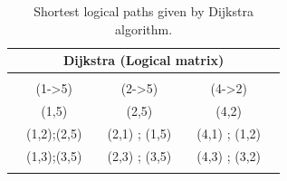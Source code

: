 \begin{table}[H]
	\centering
\begin{tabular}{|lcllcllcll|}
	\hline
	\multicolumn{10}{|c|}{Dijkstra (Logical matrix)}                                                                                                                                                           \\ \hline
	& \multicolumn{1}{l}{}          &          &                       & \multicolumn{1}{l}{}          &          &                       & \multicolumn{1}{l}{}          &          &  \\ \cline{2-3} \cline{5-6} \cline{8-9}
	\multicolumn{1}{|l|}{} & \multicolumn{2}{c|}{(1-\textgreater{}5)} & \multicolumn{1}{l|}{} & \multicolumn{2}{c|}{(2-\textgreater{}5)} & \multicolumn{1}{l|}{} & \multicolumn{2}{c|}{(4-\textgreater{}2)} &  \\ \cline{2-3} \cline{5-6} \cline{8-9}
	\multicolumn{1}{|l|}{} & \multicolumn{2}{c|}{(1,5)}               & \multicolumn{1}{l|}{} & \multicolumn{2}{c|}{(2,5)}               & \multicolumn{1}{l|}{} & \multicolumn{2}{c|}{(4,2)}               &  \\ \cline{2-3} \cline{5-6} \cline{8-9}
	\multicolumn{1}{|l|}{} & \multicolumn{2}{c|}{(1,2);(2,5)}         & \multicolumn{1}{l|}{} & \multicolumn{2}{c|}{(2,1) ; (1,5)}       & \multicolumn{1}{l|}{} & \multicolumn{2}{c|}{(4,1) ; (1,2)}       &  \\ \cline{2-3} \cline{5-6} \cline{8-9}
	\multicolumn{1}{|l|}{} & \multicolumn{2}{c|}{(1,3);(3,5)}         & \multicolumn{1}{l|}{} & \multicolumn{2}{c|}{(2,3) ; (3,5)}       & \multicolumn{1}{l|}{} & \multicolumn{2}{c|}{(4,3) ; (3,2)}       &  \\ \cline{2-3} \cline{5-6} \cline{8-9}
	& \multicolumn{1}{l}{}          &          &                       & \multicolumn{1}{l}{}          &          &                       & \multicolumn{1}{l}{}          &          &  \\ \hline
\end{tabular}
	\caption{Shortest logical paths given by Dijkstra algorithm.}
	\label{dijkstra_example}
\end{table}



